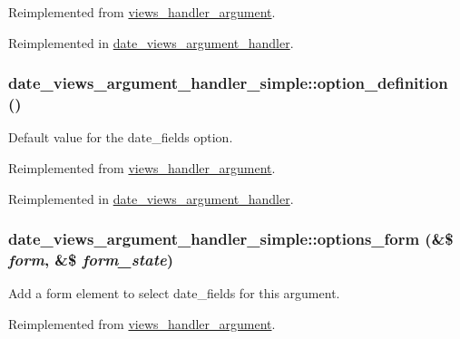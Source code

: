 Reimplemented from \hyperlink{classviews__handler__argument_a2c7e59a9df090d59d9d7d2827b6da85a}{views\_\-handler\_\-argument}.

Reimplemented in \hyperlink{classdate__views__argument__handler_a8dd865de550c6c5d34ab8aea1d3ba204}{date\_\-views\_\-argument\_\-handler}.\hypertarget{classdate__views__argument__handler__simple_a346c709c51b14ccaaf186c3651eba925}{
\subsubsection[{option\_\-definition}]{\setlength{\rightskip}{0pt plus 5cm}date\_\-views\_\-argument\_\-handler\_\-simple::option\_\-definition ()}}
\label{classdate__views__argument__handler__simple_a346c709c51b14ccaaf186c3651eba925}
Default value for the date\_\-fields option. 

Reimplemented from \hyperlink{classviews__handler__argument}{views\_\-handler\_\-argument}.

Reimplemented in \hyperlink{classdate__views__argument__handler_adb343ee7cff6d4db4744cd7af723d03f}{date\_\-views\_\-argument\_\-handler}.\hypertarget{classdate__views__argument__handler__simple_a5e0544a2cc996a45bca1ff1982da9fbc}{
\subsubsection[{options\_\-form}]{\setlength{\rightskip}{0pt plus 5cm}date\_\-views\_\-argument\_\-handler\_\-simple::options\_\-form (\&\$ {\em form}, \/  \&\$ {\em form\_\-state})}}
\label{classdate__views__argument__handler__simple_a5e0544a2cc996a45bca1ff1982da9fbc}
Add a form element to select date\_\-fields for this argument. 

Reimplemented from \hyperlink{classviews__handler__argument_a44f015a0d527983ae6df2689f66b2c24}{views\_\-handler\_\-argument}.

